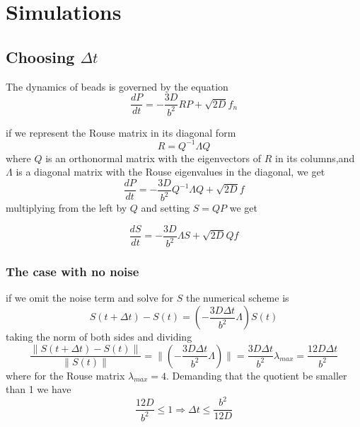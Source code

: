 \documentclass{paper}
\begin{document}
\section{Simulations}
\subsection{Choosing $\Delta t$}
The dynamics of beads is governed by the equation
\begin{equation*}
\frac{dP}{dt} = -\frac{3D}{b^2}RP+\sqrt{2D}f_n
\end{equation*}

if we represent the Rouse matrix in its diagonal form 
\begin{equation*}
R=Q^{-1}\Lambda Q
\end{equation*}
where $Q$ is an orthonormal matrix with the eigenvectors of $R$ in its columns,and $\Lambda$ is a diagonal matrix with the Rouse eigenvalues in the diagonal, we get 
\begin{equation*}
\frac{dP}{dt} = -\frac{3D}{b^2}Q^{-1}\Lambda Q+\sqrt{2D}f
\end{equation*}
multiplying from the left by $Q$ and setting $S=QP$ we get 

\begin{equation*}
\frac{dS}{dt}=-\frac{3D}{b^2}\Lambda S+\sqrt{2D}Qf
\end{equation*}
\subsubsection{The case with no noise}
if we omit the noise term and solve for $S$ 
the numerical scheme is 
\begin{equation*}
S(t+\Delta t)-S(t)=(-\frac{3D\Delta t}{b^2}\Lambda)S(t)
\end{equation*}
taking the norm of both sides and dividing 
\begin{equation*}
\frac{\|S(t+\Delta t)-S(t)\|}{\|S(t)\|}=\|(-\frac{3D\Delta t}{b^2}\Lambda)\| = \frac{3D\Delta t}{b^2}\lambda_{max}= \frac{12D\Delta t}{b^2}
\end{equation*}
where for the Rouse matrix $\lambda_{max} = 4$.  Demanding that the quotient be smaller than 1 we have 
\begin{equation*}
 \frac{12D}{b^2}\leq1 \Longrightarrow \Delta t \leq \frac{b^2}{12D}
 \end{equation*}
\end{document}
